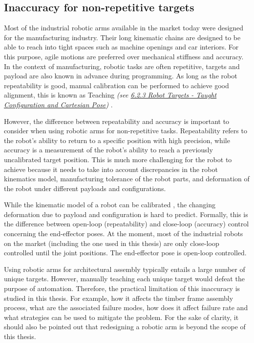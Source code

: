 \subsection{Inaccuracy for non-repetitive targets}

Most of the industrial robotic arms available in the market today were designed for the manufacturing industry. Their long kinematic chains are designed to be able to reach into tight spaces such as machine openings and car interiors. For this purpose, agile motions are preferred over mechanical stiffness and accuracy. In the context of manufacturing, robotic tasks are often repetitive, targets and payload are also known in advance during programming. As long as the robot repeatability is good, manual calibration can be performed to achieve good alignment, this is known as Teaching \textit{(see \ul{6.2.3 Robot Targets - Taught Configuration and Cartesian Pose})} \parencite{shohamRobotTeachingMethods1984}.

However, the difference between repeatability and accuracy is important to consider when using robotic arms for non-repetitive tasks. Repeatability refers to the robot's ability to return to a specific position with high precision, while accuracy is a measurement of the robot's ability to reach a previously uncalibrated target position. This is much more challenging for the robot to achieve because it needs to take into account discrepancies in the robot kinematics model, manufacturing tolerance of the robot parts, and deformation of the robot under different payloads and configurations. 

While the kinematic model of a robot can be calibrated \parencite{mooringFundamentalsManipulatorCalibration1991}, the changing deformation due to payload and configuration is hard to predict. Formally, this is the difference between open-loop (repeatability) and close-loop (accuracy) control concerning the end-effector poses. At the moment, most of the industrial robots on the market (including the one used in this thesis) are only close-loop controlled until the joint positions. The end-effector pose is open-loop controlled.  

Using robotic arms for architectural assembly typically entails a large number of unique targets. However, manually teaching each unique target would defeat the purpose of automation. Therefore, the practical limitation of this inaccuracy is studied in this thesis. For example, how it affects the timber frame assembly process, what are the associated failure modes, how does it affect failure rate and what strategies can be used to mitigate the problem. For the sake of clarity, it should also be pointed out that redesigning a robotic arm is beyond the scope of this thesis.

